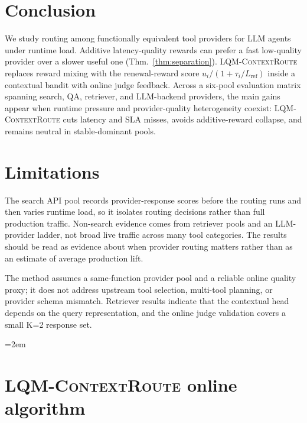 \documentclass[11pt]{article}
\newcommand{\lqmcr}{\textsc{LQM-ContextRoute}}
\begin{document}
\section{Conclusion}
We study routing among functionally equivalent tool providers for LLM agents under runtime load. Additive latency-quality rewards can prefer a fast low-quality provider over a slower useful one (Thm.~\ref{thm:separation}). \lqmcr{} replaces reward mixing with the renewal-reward score $u_i/(1+\tau_i/L_{\text{ref}})$ inside a contextual bandit with online judge feedback. Across a six-pool evaluation matrix spanning search, QA, retriever, and LLM-backend providers, the main gains appear when runtime pressure and provider-quality heterogeneity coexist: \lqmcr{} cuts latency and SLA misses, avoids additive-reward collapse, and remains neutral in stable-dominant pools.

\section*{Limitations}
\label{sec:limitations}

The search API pool records provider-response scores before the routing runs and then varies runtime load, so it isolates routing decisions rather than full production traffic. Non-search evidence comes from retriever pools and an LLM-provider ladder, not broad live traffic across many tool categories. The results should be read as evidence about when provider routing matters rather than as an estimate of average production lift.

The method assumes a same-function provider pool and a reliable online quality proxy; it does not address upstream tool selection, multi-tool planning, or provider schema mismatch. Retriever results indicate that the contextual head depends on the query representation, and the online judge validation covers a small K=2 response set.

{\sloppy\emergencystretch=2em

\par}


\appendix

\section{\lqmcr{} online algorithm}
\label{app:algorithm}
\end{document}
